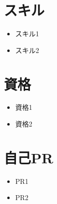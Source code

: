 \documentclass[12pt,a4paper,dvipdfmx]{jarticle}
\begin{document}
\section{スキル}

\begin{itemize}

	\item{スキル1}

	\item{スキル2}

\end{itemize}	

\section{資格}

\begin{itemize}

	\item{資格1}

	\item{資格2}

\end{itemize}	
		
\section{自己PR}

\begin{itemize}

	\item{PR1}

	\item{PR2}

\end{itemize}	
\end{document}
